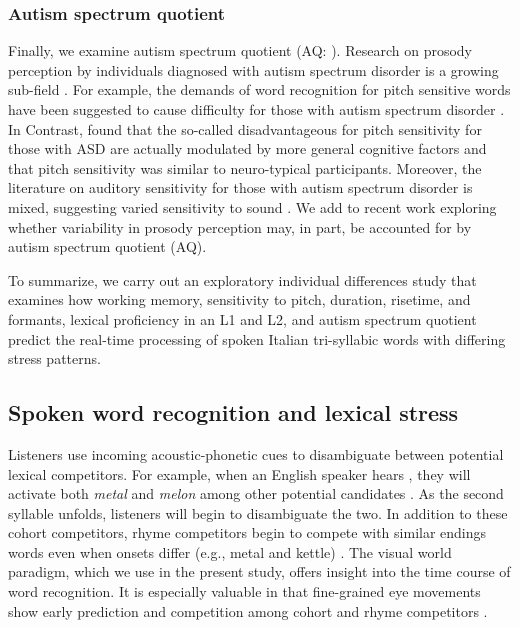 \subsubsection{Autism spectrum quotient}
Finally, we examine autism spectrum quotient (AQ: \cite{Baron-Cohen2001}). Research on prosody perception by individuals diagnosed with autism spectrum disorder is a growing sub-field  \citep[see ][]{Grice2023,Paul2005,McCann2003}. For example, the demands of word recognition for pitch sensitive words have been suggested to cause difficulty for those with autism spectrum disorder \citep{schelinski2020speech}. In Contrast, \cite{grossman2023relationship} found that the so-called disadvantageous for pitch sensitivity for those with ASD are actually modulated by more general cognitive factors and that pitch sensitivity was similar to neuro-typical participants. Moreover, the literature on auditory sensitivity for those with autism spectrum disorder is mixed, suggesting varied sensitivity to sound \citep{Kuiper2019,Stiegler2010}. We add to recent work \cite{Sinagra2022} exploring whether variability in prosody perception may, in part, be accounted for by autism spectrum quotient (AQ). 

To summarize, we carry out an exploratory individual differences study that examines how working memory, sensitivity to pitch, duration, risetime, and formants, lexical proficiency in an L1 and L2, and autism spectrum quotient predict the real-time processing of spoken Italian tri-syllabic words with differing stress patterns.

\subsection{Spoken word recognition and lexical stress}

Listeners use incoming acoustic-phonetic cues to disambiguate between potential lexical competitors. For example, when an English speaker hears , they will activate both \textit{metal} and \textit{melon} among other potential candidates \citep{Marslen1980}. As the second syllable unfolds, listeners will begin to disambiguate the two. In addition to these cohort competitors, rhyme competitors begin to compete with similar endings words even when onsets differ (e.g., metal and kettle) \citep{Allopenna_1998}. The visual world paradigm, which we use in the present study, offers insight into the time course of word recognition. It is especially valuable in that fine-grained eye movements show early prediction and competition among cohort and rhyme competitors \citep{Allopenna_1998}.

